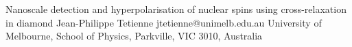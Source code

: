 \begin{conf-abstract}[]
{Nanoscale detection and hyperpolarisation of nuclear spins using cross-relaxation in diamond}
{\color{blue} Jean-Philippe Tetienne}
{jtetienne@unimelb.edu.au}
{University of Melbourne, School of Physics, Parkville, VIC 3010, Australia}
{\decofourleft \decofourright}





\printbibliography[heading=none]

\end{conf-abstract}
